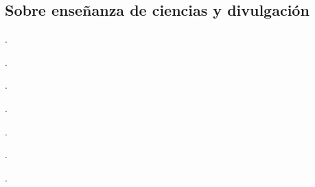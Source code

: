 \begin{etaremune}
\end{etaremune}

\subsection{Sobre enseñanza de ciencias y divulgación}
\begin{etaremune}
  \item {}.
  \item {}.
  \item {}.
  \item {}.
  \item {}.
  \item {}.
  \item {}.
\end{etaremune}
